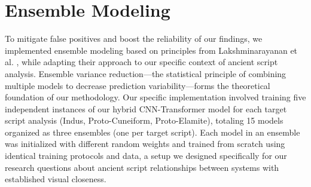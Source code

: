 \documentclass[11pt,a4paper,oneside]{report}
\begin{document}
\section{Ensemble Modeling}
\noindent\hspace{1cm}
To mitigate false positives and boost the reliability of our findings, we implemented ensemble modeling based on principles from Lakshminarayanan et al. \cite{lakshminarayanan_simple_2016}, while adapting their approach to our specific context of ancient script analysis. Ensemble variance reduction—the statistical principle of combining multiple models to decrease prediction variability—forms the theoretical foundation of our methodology. Our specific implementation involved training five independent instances of our hybrid CNN-Transformer model for each target script analysis (Indus, Proto-Cuneiform, Proto-Elamite), totaling 15 models organized as three ensembles (one per target script). Each model in an ensemble was initialized with different random weights and trained from scratch using identical training protocols and data, a setup we designed specifically for our research questions about ancient script relationships between systems with established visual closeness\cite{daggumati_data_2018}.
\end{document}
